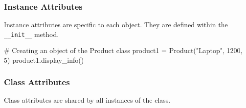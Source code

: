 \documentclass[
  letterpaper,
  DIV=11,
  numbers=noendperiod]{scrreprt}
\newenvironment{Shaded}{\begin{snugshade}}{\end{snugshade}}
\newcommand{\BuiltInTok}[1]{\textcolor[rgb]{0.00,0.23,0.31}{#1}}
\newcommand{\CommentTok}[1]{\textcolor[rgb]{0.37,0.37,0.37}{#1}}
\newcommand{\DecValTok}[1]{\textcolor[rgb]{0.68,0.00,0.00}{#1}}
\newcommand{\FunctionTok}[1]{\textcolor[rgb]{0.28,0.35,0.67}{#1}}
\newcommand{\KeywordTok}[1]{\textcolor[rgb]{0.00,0.23,0.31}{\textbf{#1}}}
\newcommand{\NormalTok}[1]{\textcolor[rgb]{0.00,0.23,0.31}{#1}}
\newcommand{\OperatorTok}[1]{\textcolor[rgb]{0.37,0.37,0.37}{#1}}
\newcommand{\SpecialCharTok}[1]{\textcolor[rgb]{0.37,0.37,0.37}{#1}}
\newcommand{\SpecialStringTok}[1]{\textcolor[rgb]{0.13,0.47,0.30}{#1}}
\newcommand{\StringTok}[1]{\textcolor[rgb]{0.13,0.47,0.30}{#1}}
\newcommand{\VariableTok}[1]{\textcolor[rgb]{0.07,0.07,0.07}{#1}}
\begin{document}
\subsubsection{Instance Attributes}\label{instance-attributes}

Instance attributes are specific to each object. They are defined within
the \texttt{\_\_init\_\_} method.

\begin{Shaded}
\end{Shaded}

\begin{Shaded}
\begin{Highlighting}[]
\CommentTok{\# Creating an object of the Product class}
\NormalTok{product1 }\OperatorTok{=}\NormalTok{ Product(}\StringTok{"Laptop"}\NormalTok{, }\DecValTok{1200}\NormalTok{, }\DecValTok{5}\NormalTok{)}
\NormalTok{product1.display\_info()  }
\end{Highlighting}
\end{Shaded}

\subsubsection{Class Attributes}\label{class-attributes}

Class attributes are shared by all instances of the class.
\end{document}
